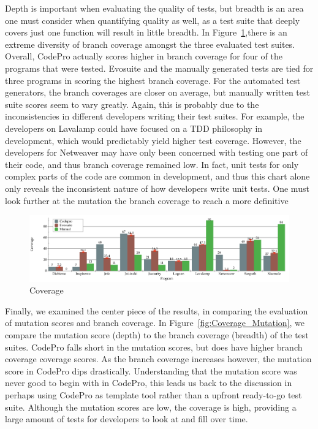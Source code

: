 Depth is important when evaluating the quality of tests, but breadth is an area one must consider when quantifying quality as well, as a test suite that deeply covers just one function will result in little breadth. In Figure~\ref{fig:Coverage},there is an extreme diversity of branch coverage amongst the three evaluated test suites. Overall, CodePro actually scores higher in branch coverage for four of the programs that were tested. Evosuite and the manually generated tests are tied for three programs in scoring the highest branch coverage. For the automated test generators, the branch coverages are closer on average, but manually written test suite scores seem to vary greatly. Again, this is probably due to the inconsistencies in different developers writing their test suites. For example, the developers on Lavalamp could have focused on a TDD philosophy in development, which would predictably yield higher test coverage. However, the developers for Netweaver may have only been concerned with testing one part of their code, and thus branch coverage remained low. In fact, unit tests for only complex parts of the code are common in development, and thus this chart alone only reveals the inconsistent nature of how developers write unit tests. One must look further at the mutation the branch coverage to reach a more definitive 

\begin{figure}[!t]
\centering
  \includegraphics[width=\textwidth]{Coverage}
    \caption{Coverage}
  \label{fig:Coverage}
\end{figure}

Finally, we examined the center piece of the results, in comparing the evaluation of mutation scores and branch coverage. In Figure~\ref{fig:Coverage_Mutation}, we compare the mutation score (depth) to the branch coverage (breadth) of the test suites. CodePro falls short in the mutation scores, but does have higher branch coverage coverage scores. As the branch coverage increases however, the mutation score in CodePro dips drastically. Understanding that the mutation score was never good to begin with in CodePro, this leads us back to the discussion in perhaps using CodePro as template tool rather than a upfront ready-to-go test suite. Although the mutation scores are low, the coverage is high, providing a large amount of tests for developers to look at and fill over time. 

